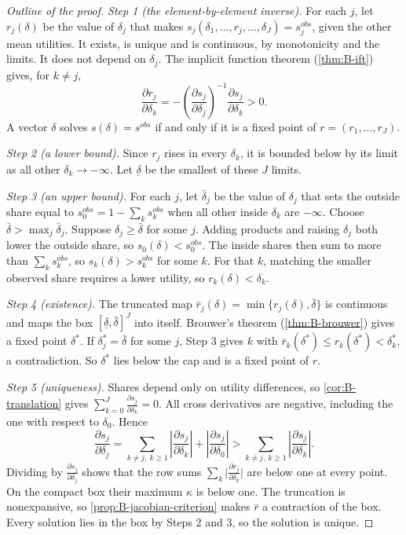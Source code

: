 \begin{proof}[Outline of the proof]
\emph{Step 1 (the element-by-element inverse).} For each $j$, let $r_j(\delta)$ be the value of $\delta_j$
that makes $s_j(\delta_1, \dots, r_j, \dots, \delta_J) = s^{obs}_j$, given the other mean utilities. It exists,
is unique and is continuous, by monotonicity and the limits. It does not depend on $\delta_j$. The implicit
function theorem (\cref{thm:B-ift}) gives, for $k \neq j$,
\begin{equation*}
  \frac{\partial r_j}{\partial\delta_k} = -\left(\frac{\partial s_j}{\partial\delta_j}\right)^{-1}
  \frac{\partial s_j}{\partial\delta_k} > 0.
\end{equation*}
A vector $\delta$ solves $s(\delta) = s^{obs}$ if and only if it is a fixed point of $r = (r_1, \dots, r_J)$.

\emph{Step 2 (a lower bound).} Since $r_j$ rises in every $\delta_k$, it is bounded below by its limit as all
other $\delta_k \to -\infty$. Let $\underline\delta$ be the smallest of these $J$ limits.

\emph{Step 3 (an upper bound).} For each $j$, let $\bar\delta_j$ be the value of $\delta_j$ that sets the
outside share equal to $s^{obs}_0 = 1 - \sum_ks^{obs}_k$ when all other inside $\delta_k$ are $-\infty$. Choose
$\bar\delta > \max_j\bar\delta_j$. Suppose $\delta_j \geq \bar\delta$ for some $j$. Adding products and
raising $\delta_j$ both lower the outside share, so $s_0(\delta) < s^{obs}_0$. The inside shares then sum to
more than $\sum_ks^{obs}_k$, so $s_k(\delta) > s^{obs}_k$ for some $k$. For that $k$, matching the smaller
observed share requires a lower utility, so $r_k(\delta) < \delta_k$.

\emph{Step 4 (existence).} The truncated map $\bar r_j(\delta) = \min\{r_j(\delta), \bar\delta\}$ is continuous
and maps the box $[\underline\delta, \bar\delta]^J$ into itself. Brouwer's theorem (\cref{thm:B-brouwer})
gives a fixed point $\delta^*$. If $\delta^*_j = \bar\delta$ for some $j$, Step 3 gives $k$ with $\bar
r_k(\delta^*) \leq r_k(\delta^*) < \delta^*_k$, a contradiction. So $\delta^*$ lies below the cap and is a fixed
point of $r$.

\emph{Step 5 (uniqueness).} Shares depend only on utility differences, so \cref{cor:B-translation} gives
$\sum_{k=0}^{J}\frac{\partial s_j}{\partial\delta_k} = 0$. All cross derivatives are negative, including the
one with respect to $\delta_0$. Hence
\begin{equation}\label{eq:B-berry-dd}
  \frac{\partial s_j}{\partial\delta_j} = \sum_{k \neq j,\ k \geq 1}\left|\frac{\partial
  s_j}{\partial\delta_k}\right| + \left|\frac{\partial s_j}{\partial\delta_0}\right| > \sum_{k \neq j,\ k \geq
  1}\left|\frac{\partial s_j}{\partial\delta_k}\right|.
\end{equation}
Dividing by $\frac{\partial s_j}{\partial\delta_j}$ shows that the row sums $\sum_k\big|\frac{\partial
r_j}{\partial\delta_k}\big|$ are below one at every point. On the compact box their maximum $\kappa$ is
below one. The truncation is nonexpansive, so \cref{prop:B-jacobian-criterion} makes $\bar r$ a contraction
of the box. Every solution lies in the box by Steps 2 and 3, so the solution is unique.
\end{proof}

